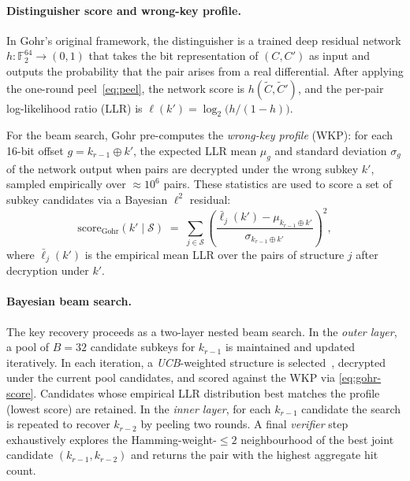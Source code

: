 \documentclass[runningheads]{llncs}
\newcommand{\xor}{\oplus}
\begin{document}
\paragraph{Distinguisher score and wrong-key profile.}
In Gohr's original framework, the distinguisher is a trained deep
residual network $h : \mathbb{F}_2^{64} \to (0,1)$ that takes the
bit representation of $(C, C')$ as input and outputs the probability
that the pair arises from a real differential.  After applying the
one-round peel~\eqref{eq:peel}, the network score is
$h(\tilde{C}, \tilde{C}')$, and the per-pair log-likelihood ratio
(LLR) is $\ell(k') = \log_2\bigl(h / (1 - h)\bigr)$.

For the beam search, Gohr pre-computes the \emph{wrong-key
profile} (WKP): for each 16-bit offset $g = k_{r-1} \xor k'$, the
expected LLR mean $\mu_g$ and standard deviation $\sigma_g$ of the
network output when pairs are decrypted under the wrong subkey $k'$,
sampled empirically over $\approx 10^6$ pairs.  These statistics are
used to score a set of subkey candidates via a Bayesian
$\ell^2$ residual:
\begin{equation}
  \label{eq:gohr-score}
  \mathrm{score}_{\mathrm{Gohr}}(k' \mid \mathcal{S})
  \;=\;
  \sum_{j \in \mathcal{S}}
  \left(\frac{\bar{\ell}_j(k') - \mu_{k_{r-1} \xor k'}}
             {\sigma_{k_{r-1} \xor k'}}\right)^{\!2},
\end{equation}
where $\bar{\ell}_j(k')$ is the empirical mean LLR over the pairs of
structure $j$ after decryption under $k'$.

\paragraph{Bayesian beam search.}
The key recovery proceeds as a two-layer nested beam search.
In the \emph{outer layer}, a pool of $B = 32$ candidate subkeys for
$k_{r-1}$ is maintained and updated iteratively.  In each iteration,
a \emph{UCB}-weighted structure is selected~\cite{ACF02}, decrypted
under the current pool candidates, and scored against the WKP via
\eqref{eq:gohr-score}.  Candidates whose empirical LLR distribution
best matches the profile (lowest score) are retained.
In the \emph{inner layer}, for each $k_{r-1}$ candidate the search
is repeated to recover $k_{r-2}$ by peeling two rounds.
A final \emph{verifier} step exhaustively explores the Hamming-weight-$\le 2$
neighbourhood of the best joint candidate $(k_{r-1}, k_{r-2})$ and
returns the pair with the highest aggregate hit count.
\end{document}
